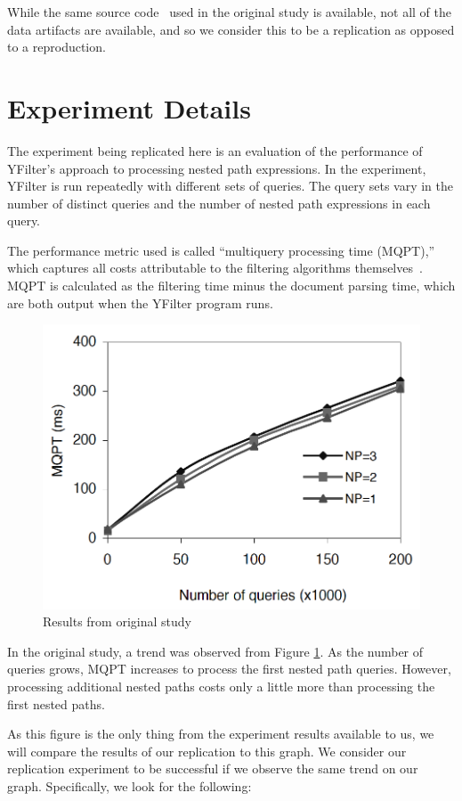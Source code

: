 \documentclass[sigconf, nonacm]{acmart}
\begin{document}
While the same source code~\cite{yfilter_source} used in the original study is available, not all of the data artifacts are available, and so we consider this to be a replication as opposed to a reproduction. 

\section{Experiment Details}

The experiment being replicated here is an evaluation of the performance of YFilter's approach to processing nested path expressions. In the experiment, YFilter is run repeatedly with different sets of queries. The query sets vary in the number of distinct queries and the number of nested path expressions in each query.

The performance metric used is called ``multiquery processing time (MQPT),'' which captures all costs attributable to the filtering algorithms themselves~\cite{yfilter}. MQPT is calculated as the filtering time minus the document parsing time, which are both output when the YFilter program runs.

\begin{figure}
  \centering
  \includegraphics[width=0.75\linewidth]{results/reference_figure.png}
  \caption{Results from original study~\cite{yfilter}}
  \label{fig:reference_figure}
\end{figure}

In the original study, a trend was observed from Figure \ref{fig:reference_figure}. As the number of queries grows, MQPT increases to process the first nested path queries. However, processing additional nested paths costs only a little more than processing the first nested paths.~\cite{yfilter}

As this figure is the only thing from the experiment results available to us, we will compare the results of our replication to this graph. We consider our replication experiment to be successful if we observe the same trend on our graph. Specifically, we look for the following:
\end{document}
